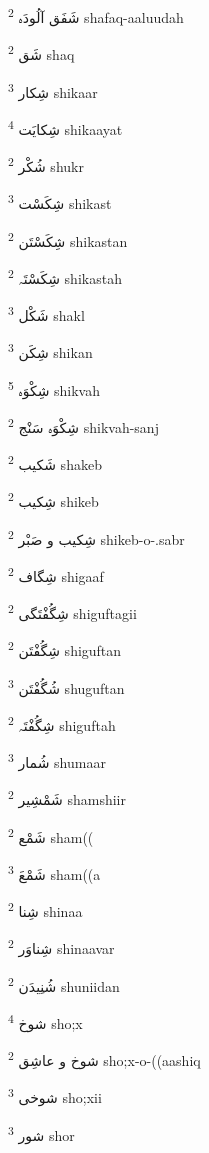 \documentclass[12pt]{article}
\begin{document}
\begin{multicols}{5}
{\ur شَفَق آلُودَہ}   \textsuperscript{2} shafaq-aaluudah

{\ur شَق}   \textsuperscript{2} shaq

{\ur شِکار}   \textsuperscript{3} shikaar

{\ur شِکایَت}   \textsuperscript{4} shikaayat

{\ur شُکْر}   \textsuperscript{2} shukr

{\ur شِکَسْت}   \textsuperscript{3} shikast

{\ur شِکَسْتَن}   \textsuperscript{2} shikastan

{\ur شِکَسْتَہ}   \textsuperscript{2} shikastah

{\ur شَکْل}   \textsuperscript{3} shakl

{\ur شِکَن}   \textsuperscript{3} shikan

{\ur شِکْوَہ}   \textsuperscript{5} shikvah

{\ur شِکْوَہ سَنْج}   \textsuperscript{2} shikvah-sanj

{\ur شَکیب}   \textsuperscript{2} shakeb

{\ur شِکیب}   \textsuperscript{2} shikeb

{\ur شِکیب و صَبْر}   \textsuperscript{2} shikeb-o-.sabr

{\ur شِگاف}   \textsuperscript{2} shigaaf

{\ur شِگُفْتَگی}   \textsuperscript{2} shiguftagii

{\ur شِگُفْتَن}   \textsuperscript{2} shiguftan

{\ur شُگُفْتَن}   \textsuperscript{3} shuguftan

{\ur شِگُفْتَہ}   \textsuperscript{2} shiguftah

{\ur شُمار}   \textsuperscript{3} shumaar

{\ur شَمْشِیر}   \textsuperscript{2} shamshiir

{\ur شَمْع}   \textsuperscript{2} sham((

{\ur شَمْعَ}   \textsuperscript{3} sham((a

{\ur شِنا}   \textsuperscript{2} shinaa

{\ur شِناوَر}   \textsuperscript{2} shinaavar

{\ur شُنِیدَن}   \textsuperscript{2} shuniidan

{\ur شوخ}   \textsuperscript{4} sho;x

{\ur شوخ و عاشِق}   \textsuperscript{2} sho;x-o-((aashiq

{\ur شوخی}   \textsuperscript{3} sho;xii

{\ur شور}   \textsuperscript{3} shor


\end{multicols}
\end{document}
